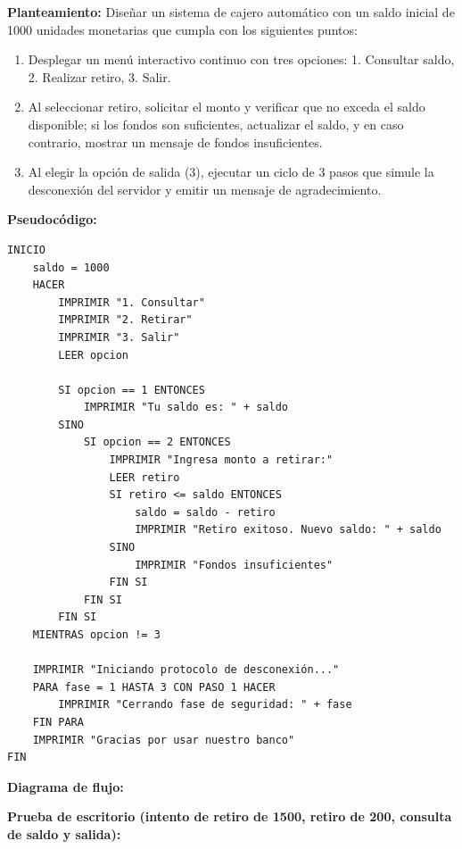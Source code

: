 \textbf{Planteamiento:} Diseñar un sistema de cajero automático con un
saldo inicial de 1000 unidades monetarias que cumpla con los siguientes
puntos:

\begin{enumerate}
\def\labelenumi{\arabic{enumi}.}
\tightlist
\item
  Desplegar un menú interactivo continuo con tres opciones: 1. Consultar
  saldo, 2. Realizar retiro, 3. Salir.
\item
  Al seleccionar retiro, solicitar el monto y verificar que no exceda el
  saldo disponible; si los fondos son suficientes, actualizar el saldo,
  y en caso contrario, mostrar un mensaje de fondos insuficientes.
\item
  Al elegir la opción de salida (3), ejecutar un ciclo de 3 pasos que
  simule la desconexión del servidor y emitir un mensaje de
  agradecimiento.
\end{enumerate}

\textbf{Pseudocódigo:}

\begin{verbatim}
INICIO
    saldo = 1000
    HACER
        IMPRIMIR "1. Consultar"
        IMPRIMIR "2. Retirar"
        IMPRIMIR "3. Salir"
        LEER opcion
        
        SI opcion == 1 ENTONCES
            IMPRIMIR "Tu saldo es: " + saldo
        SINO
            SI opcion == 2 ENTONCES
                IMPRIMIR "Ingresa monto a retirar:"
                LEER retiro
                SI retiro <= saldo ENTONCES
                    saldo = saldo - retiro
                    IMPRIMIR "Retiro exitoso. Nuevo saldo: " + saldo
                SINO
                    IMPRIMIR "Fondos insuficientes"
                FIN SI
            FIN SI
        FIN SI
    MIENTRAS opcion != 3
    
    IMPRIMIR "Iniciando protocolo de desconexión..."
    PARA fase = 1 HASTA 3 CON PASO 1 HACER
        IMPRIMIR "Cerrando fase de seguridad: " + fase
    FIN PARA
    IMPRIMIR "Gracias por usar nuestro banco"
FIN
\end{verbatim}

\clearpage

\textbf{Diagrama de flujo:}



\textbf{Prueba de escritorio (intento de retiro de 1500, retiro de 200,
consulta de saldo y salida):}


